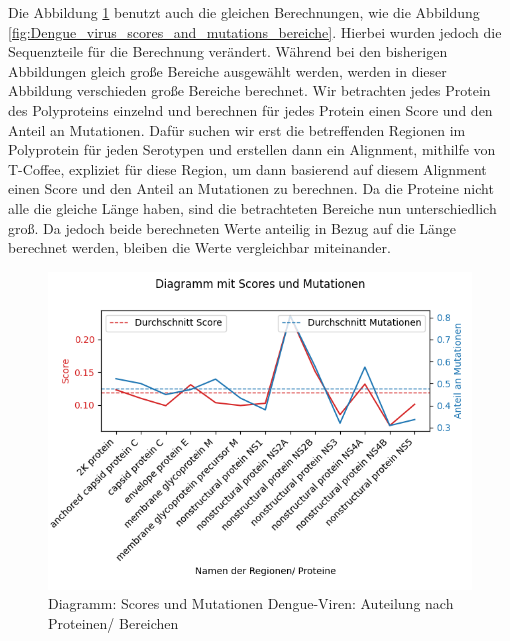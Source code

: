 \documentclass[german,version-2022-01]{uzl-thesis}
\begin{document}
Die Abbildung \ref{fig:Dengue_virus_scores_and_mutations_namen} benutzt auch die gleichen Berechnungen, wie die Abbildung \ref{fig:Dengue_virus_scores_and_mutations_bereiche}. Hierbei wurden jedoch die Sequenzteile f\"ur die Berechnung ver\"andert. W\"ahrend bei den bisherigen Abbildungen gleich gro\ss{}e Bereiche ausgew\"ahlt werden, werden in dieser Abbildung verschieden gro\ss{}e Bereiche berechnet. Wir betrachten jedes Protein des Polyproteins einzelnd und berechnen f\"ur jedes Protein einen Score und den Anteil an Mutationen. Daf\"ur suchen wir erst die betreffenden Regionen im Polyprotein f\"ur jeden Serotypen und erstellen dann ein Alignment, mithilfe von T-Coffee, expliziet f\"ur diese Region, um dann basierend auf diesem Alignment einen Score und den Anteil an Mutationen zu berechnen. Da die Proteine nicht alle die gleiche L\"ange haben, sind die betrachteten Bereiche nun unterschiedlich gro\ss{}. Da jedoch beide berechneten Werte anteilig in Bezug auf die L\"ange berechnet werden, bleiben die Werte vergleichbar miteinander. 
\begin{figure}[htpb]
  \centering
  \includegraphics[scale=0.75]{Images/Diagramm_Scores_und_Mutationen_Dengue_viren_Namen.png}
  \caption{Diagramm: Scores und Mutationen Dengue-Viren: Auteilung nach Proteinen/ Bereichen}
  \label{fig:Dengue_virus_scores_and_mutations_namen}
\end{figure}
\end{document}
